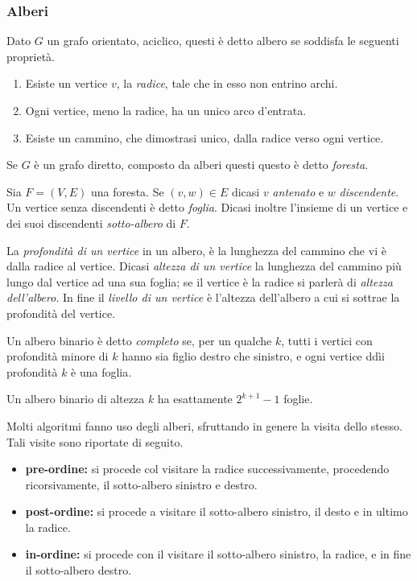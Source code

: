\documentclass{subfiles}
\begin{document}
\subsubsection{Alberi}
\begin{Definition*}
    Dato \(G\) un grafo orientato, aciclico, questi è detto albero se soddisfa le seguenti proprietà.
    \begin{enumerate}
        \item Esiste un vertice \(v\), la \emph{radice}, tale che in esso non entrino archi.
        \item Ogni vertice, meno la radice, ha un unico arco d'entrata.
        \item Esiste un cammino, che dimostrasi unico, dalla radice verso ogni vertice.
    \end{enumerate}
\end{Definition*}

\begin{Note*}
    Se \(G\) è un grafo diretto, composto da alberi questi questo è detto \emph{foresta}.
\end{Note*}

\begin{Definition*}
    Sia \(F = (V, E)\) una foresta. Se \((v, w) \in E\) dicasi \(v\) \emph{antenato} e \(w\) \emph{discendente}.
    Un vertice senza discendenti è detto \emph{foglia}. Dicasi inoltre l'insieme di un vertice e dei suoi discendenti \emph{sotto-albero} di \(F\).
\end{Definition*}

\noindent La \emph{profondità di un vertice} in un albero, è la lunghezza del cammino che vi è dalla radice al vertice.
Dicasi \emph{altezza di un vertice} la lunghezza del cammino più lungo dal vertice ad una sua foglia; se il vertice è la radice si parlerà di \emph{altezza dell'albero}.
In fine il \emph{livello di un vertice} è l'altezza dell'albero a cui si sottrae la profondità del vertice.

\begin{Definition*}
    Un albero binario è detto \emph{completo} se, per un qualche \(k\), tutti i vertici con profondità minore di \(k\) hanno sia figlio destro che sinistro,
    e ogni vertice ddìi profondità \(k\) è una foglia.
\end{Definition*}

\begin{Remark*}
    Un albero binario di altezza \(k\) ha esattamente \(2^{k + 1} - 1\) foglie.
\end{Remark*}

\noindent Molti algoritmi fanno uso degli alberi, sfruttando in genere la visita dello stesso. Tali visite sono riportate di seguito.
\begin{itemize}
    \item \textbf{pre-ordine:} si procede col visitare la radice successivamente, procedendo ricorsivamente, il sotto-albero sinistro e destro.
    \item \textbf{post-ordine:} si procede a visitare il sotto-albero sinistro, il desto e in ultimo la radice.
    \item \textbf{in-ordine:} si procede con il visitare il sotto-albero sinistro, la radice, e in fine il sotto-albero destro.
\end{itemize}
\end{document}
